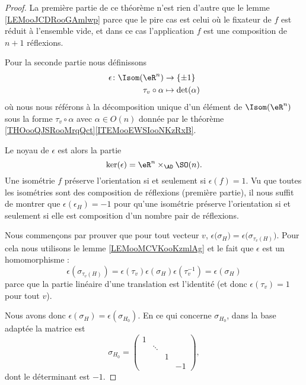 \begin{proof}
    La première partie de ce théorème n'est rien d'autre que le lemme \ref{LEMooJCDRooGAmlwp} parce que le pire cas est celui où le fixateur de \( f\) est réduit à l'ensemble vide, et dans ce cas l'application \( f\) est une composition de \( n+1\) réflexions.

    Pour la seconde partie nous définissons
    \begin{equation}
        \begin{aligned}
            \epsilon\colon \Isom(\eR^n)&\to \{ \pm 1 \} \\
            \tau_v\circ \alpha&\mapsto \det(\alpha)
        \end{aligned}
    \end{equation}
    où nous nous référons à la décomposition unique d'un élément de \( \Isom(\eR^n)\) sous la forme \( \tau_v\circ \alpha\) avec \( \alpha\in O(n)\) donnée par le théorème \ref{THOooQJSRooMrqQct}\ref{ITEMooEWSIooNKzRxB}.

    Le noyau de \( \epsilon\) est alors la partie 
    \begin{equation}
        \ker(\epsilon)=\eR^n\times_{\AD}\SO(n).
    \end{equation}
    Une isométrie \( f\) préserve l'orientation si et seulement si \( \epsilon(f)=1\). Vu que toutes les isométries sont des composition de réflexions (première partie), il nous suffit de montrer que \( \epsilon(\epsilon_H)=-1\) pour qu'une isométrie préserve l'orientation si et seulement si elle est composition d'un nombre pair de réflexions.

    Nous commençons par prouver que pour tout vecteur \( v\), \( \epsilon\big( \sigma_H \big)=\epsilon\big( \sigma_{\tau_v(H)} \big)\). Pour cela nous utilisons le lemme \ref{LEMooMCVKooKzmlAg} et le fait que \( \epsilon\) est un homomorphisme :
    \begin{equation}
        \epsilon(\sigma_{\tau_v(H)})=\epsilon(\tau_v)\epsilon(\sigma_H)\epsilon(\tau_v^{-1})=\epsilon(\sigma_H)
    \end{equation}
    parce que la partie linéaire d'une translation est l'identité (et donc \( \epsilon(\tau_v)=1\) pour tout \( v\)).

    Nous avons donc \( \epsilon(\sigma_H)=\epsilon(\sigma_{H_0})\). En ce qui concerne \( \sigma_{H_0}\), dans la base adaptée la matrice est
    \begin{equation}
        \sigma_{H_0}=\begin{pmatrix}
             1   &       &       &       \\
                &   \ddots    &       &       \\
                &       &   1    &       \\ 
                &       &       &   -1     
         \end{pmatrix},
    \end{equation}
    dont le déterminant est \( -1\).
\end{proof}

